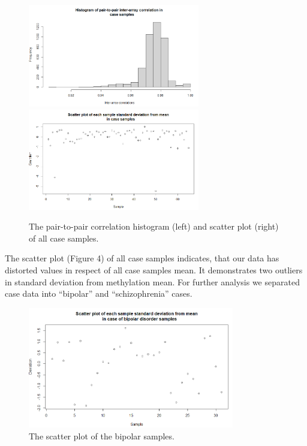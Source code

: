 \documentclass[
]{article}
\begin{document}
\begin{figure}[!h]
  \begin{center}
    \includegraphics[width=75mm]{./6.png}
    \includegraphics[width=75mm]{./8.png}
    \caption{
      The pair-to-pair correlation histogram (left) and scatter plot (right) of 
      all case samples.
    }
  \end{center}
\end{figure}

The scatter plot (Figure 4) of all case samples indicates, that our data
has distorted values in respect of all case samples mean. It
demonstrates two outliers in standard deviation from methylation mean.
For further analysis we separated case data into ``bipolar'' and
``schizophrenia'' cases.

\begin{figure}[!h]
  \begin{center}
    \includegraphics[width=90mm]{./9.png}
    \caption{
      The scatter plot of the bipolar samples.
    }
  \end{center}
\end{figure}
\end{document}
